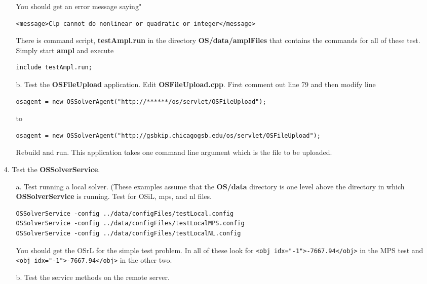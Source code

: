 \documentclass[11pt]{article}
\begin{document}
\begin{itemize}
\begin{itemize}
You should get an error message saying"
\begin{verbatim}
<message>Clp cannot do nonlinear or quadratic or integer</message>
\end{verbatim}



There is command script, {\bf testAmpl.run} in the directory {\bf OS/data/amplFiles} that contains the commands for all of these test. Simply start {\bf ampl} and execute
\begin{verbatim}
include testAmpl.run;
\end{verbatim}



\item[b.] Test the {\bf OSFileUpload} application.    Edit  {\bf OSFileUpload.cpp}. First comment out line 79 and then modify line 
\begin{verbatim}
osagent = new OSSolverAgent("http://******/os/servlet/OSFileUpload");
\end{verbatim}
to
{\small
\begin{verbatim}
osagent = new OSSolverAgent("http://gsbkip.chicagogsb.edu/os/servlet/OSFileUpload");
\end{verbatim}
}
Rebuild and run. This application takes one command line argument which is the file to be uploaded. 

\end{itemize}

\item[4.] Test the {\bf OSSolverService}.

\begin{itemize}
\item[a.] Test running a local solver.  (These examples assume that the {\bf OS/data} directory is one level above the directory  in which {\bf OSSolverService} is running. Test  for OSiL, mps, and nl files.

\begin{verbatim}
OSSolverService -config ../data/configFiles/testLocal.config
OSSolverService -config ../data/configFiles/testLocalMPS.config
OSSolverService -config ../data/configFiles/testLocalNL.config
\end{verbatim}


You should get the OSrL for the simple test problem.   In all of these look for {\tt <obj idx="-1">-7667.94</obj>} in the MPS test and {\tt <obj idx="-1">-7667.94</obj>} in the other two.


\item[b.]  Test the service methods on the remote server.  



\end{itemize}
\end{itemize}
\end{document}

